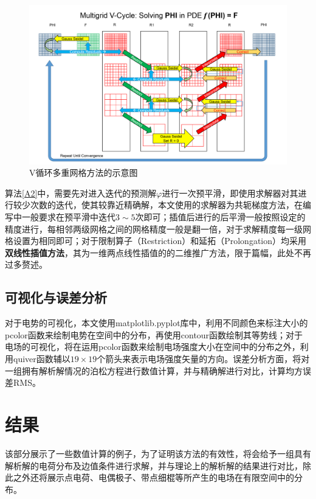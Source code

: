 \documentclass{article} %
\begin{document}
\begin{figure}
    \begin{center}
        \includegraphics[width=17cm]{Multigrid_Visualization.png}
    \end{center}
    \caption{V循环多重网格方法的示意图}
    \label{F0}
\end{figure}

算法\ref{A2}中，需要先对进入迭代的预测解$\varphi$进行一次预平滑，即使用求解器对其进行较少次数的迭代，使其较靠近精确解，本文使用的求解器为共轭梯度方法，在编写中一般要求在预平滑中迭代$3\sim 5$次即可；插值后进行的后平滑一般按照设定的精度进行，每相邻两级网格之间的网格精度一般是翻一倍，对于求解精度每一级网格设置为相同即可；对于限制算子（Restriction）和延拓（Prolongation）均采用\textbf{双线性插值方法}，其为一维两点线性插值的的二维推广方法，限于篇幅，此处不再过多赘述。

\subsection{可视化与误差分析}
对于电势的可视化，本文使用matplotlib.pyplot库中，利用不同颜色来标注大小的pcolor函数来绘制电势在空间中的分布，再使用contour函数绘制其等势线；对于电场的可视化，将在运用pcolor函数来绘制电场强度大小在空间中的分布之外，利用quiver函数辅以$19\times 19$个箭头来表示电场强度矢量的方向。误差分析方面，将对一组拥有解析解情况的泊松方程进行数值计算，并与精确解进行对比，计算均方误差RMS。

\section{结果}
该部分展示了一些数值计算的例子，为了证明该方法的有效性，将会给予一组具有解析解的电荷分布及边值条件进行求解，并与理论上的解析解的结果进行对比，除此之外还将展示点电荷、电偶极子、带点细棍等所产生的电场在有限空间中的分布。
\end{document}
